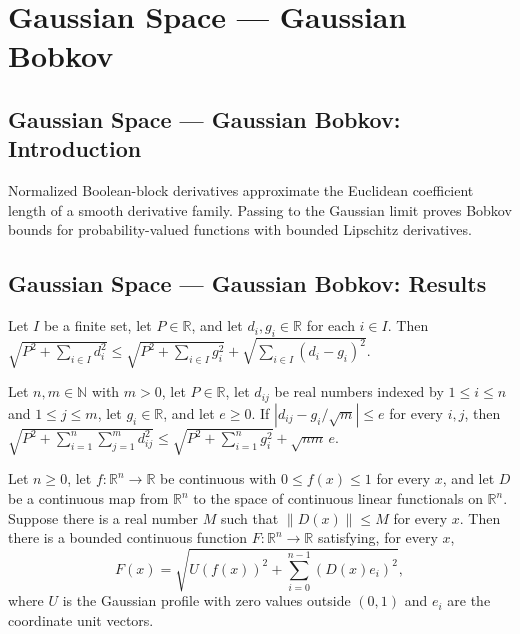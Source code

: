 \section{Gaussian Space --- Gaussian Bobkov}
\subsection*{Gaussian Space --- Gaussian Bobkov: Introduction}
Normalized Boolean-block derivatives approximate the Euclidean coefficient length of a smooth derivative family. Passing to the Gaussian limit proves Bobkov bounds for probability-valued functions with bounded Lipschitz derivatives.

\subsection*{Gaussian Space --- Gaussian Bobkov: Results}

\begin{lemma}
\leanok
{}
Let $I$ be a finite set, let $P\in\mathbb R$, and let $d_i,g_i\in\mathbb R$ for each
$i\in I$. Then $\sqrt{P^2+\sum_{i\in I}d_i^2}\le\sqrt{P^2+\sum_{i\in
I}g_i^2}+\sqrt{\sum_{i\in I}(d_i-g_i)^2}$.
\end{lemma}

\begin{lemma}
\leanok
{}
Let $n,m\in\mathbb N$ with $m>0$, let $P\in\mathbb R$, let $d_{ij}$ be real numbers
indexed by $1\le i\le n$ and $1\le j\le m$, let $g_i\in\mathbb R$, and let $e\ge0$. If
$|d_{ij}-g_i/\sqrt m|\le e$ for every $i,j$, then $\sqrt{P^2+\sum_{i=1}^n\sum_{j=1}^m
d_{ij}^2}\le\sqrt{P^2+\sum_{i=1}^n g_i^2}+\sqrt{nm}\,e$.
\end{lemma}

\begin{lemma}
\leanok
{}
Let $n\ge0$, let $f:\mathbb R^n\to\mathbb R$ be continuous with $0\le f(x)\le1$ for
every $x$, and let $D$ be a continuous map from $\mathbb R^n$ to the space of continuous
linear functionals on $\mathbb R^n$. Suppose there is a real number $M$ such that
$\|D(x)\|\le M$ for every $x$. Then there is a bounded continuous function $F:\mathbb
R^n\to\mathbb R$ satisfying, for every $x$,
\[F(x)=\sqrt{U(f(x))^2+\sum_{i=0}^{n-1}(D(x)e_i)^2},\]
where $U$ is the Gaussian profile with zero values outside $(0,1)$ and $e_i$ are the
coordinate unit vectors.
\end{lemma}

